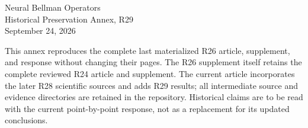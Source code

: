 \documentclass[12pt]{article}
\begin{document}
\thispagestyle{empty}
\begin{center}{\Large Neural Bellman Operators}\\[12pt]{\large Historical Preservation Annex, R29}\\[8pt]September 24, 2026\end{center}
This annex reproduces the complete last materialized R26 article, supplement, and response without changing their pages. The R26 supplement itself retains the complete reviewed R24 article and supplement. The current article incorporates the later R28 scientific sources and adds R29 results; all intermediate source and evidence directories are retained in the repository. Historical claims are to be read with the current point-by-point response, not as a replacement for its updated conclusions.
\clearpage


\end{document}
